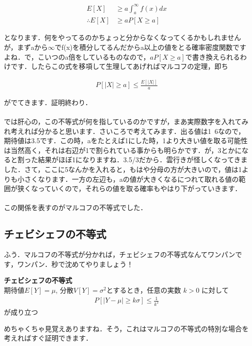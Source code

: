 \documentclass[11pt,a4paper,uplatex]{ujreport} 	%
\begin{document}
\begin{align}
  E[X] &\geq a\int_a^\infty f(x)dx\\
  \therefore E[X] &\geq aP[X\geq a]
\end{align}

となります．何をやってるのかちょっと分からなくなってくるかもしれませんが，まずaから$\infty$でf(x)を積分してるんだからa以上の値をとる確率密度関数ですよね．で，こいつのa倍をしているものなので，$aP[X\geq a]$で書き換えられるわけです．したらこの式を移項して生理してあげればマルコフの定理，即ち

\begin{align}
  P[|X|\geq a] \leq \frac{E[|X|]}{a}
\end{align}

がでてきます．証明終わり．\\
\\

では肝心の，この不等式が何を指しているのかですが，まあ実際数字を入れてみれ考えれば分かると思います．さいころで考えてみます．出る値は1~6なので，期待値は3.5です．この時，aをたとえば1にした時，1より大きい値を取る可能性は当然高く，それは右辺が1で割られている事からも明らかです．が，3とかになると割った結果がほぼ1になりますね．3.5/3だから．雲行きが怪しくなってきました．さて，ここに5なんかを入れると，もはや分母の方が大きいので，値は1よりも小さくなります．一方の左辺も，aの値が大きくなるにつれて取れる値の範囲が狭くなっていくので，それらの値を取る確率もやはり下がっていきます．\\
\\

この関係を表すのがマルコフの不等式でした．

\subsection{チェビシェフの不等式}
ふう．マルコフの不等式が分かれば，チェビシェフの不等式なんてワンパンです，ワンパン．秒で沈めてやりましょう！

\begin{screen}
  \textbf{チェビシェフの不等式}\\
  期待値$E[Y] = \mu$, 分散$V[Y] = \sigma^2$とするとき，任意の実数 $k>0$ に対して
  \begin{align}
    P[|Y-\mu| \geq k\sigma] \leq \frac{1}{k^2}
    \label{eq:cheb}
  \end{align}
  が成り立つ
\end{screen}

めちゃくちゃ見覚えありますね．そう，これはマルコフの不等式の特別な場合を考えればすぐ証明できます．\\
\end{document}
